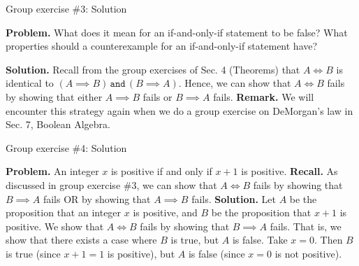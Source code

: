 \documentclass[10pt]{beamer}
\begin{document}
\begin{frame}{Group exercise \#3: Solution}

\textbf{Problem.} What does it mean for an if-and-only-if statement to be false? What properties should a counterexample for an if-and-only-if statement have?
\vfill 

\textbf{Solution.} Recall from the group exercises of Sec. 4 (Theorems) that $A \iff B$ is identical to $(A \implies B) \, \texttt{and} \, (B \implies A)$.  Hence, we can show that $A \iff B$ fails by showing that either $A \implies B$ fails or $B \implies A$ fails.
\vfill 
\pause 
\textbf{Remark.} We will encounter this strategy again when we do a group exercise on DeMorgan's law in Sec. 7, Boolean Algebra.
\end{frame}

\begin{frame}{Group exercise \#4: Solution}

\textbf{Problem.} An integer $x$ is positive if and only if $x+1$ is positive.
\pause 
\vfill 
\textbf{Recall.} As discussed in group exercise \#3, we can show that $A \iff B$ fails by showing that $B \implies A$ fails OR by showing that $A \implies B$ fails. 
\vfill 
\pause 
\textbf{Solution.}  Let $A$ be the proposition that an integer $x$ is positive, and $B$ be the proposition that $x+1$ is positive.  We show that $A \iff B$ fails by showing that $B \implies A$ fails.   That is, we show that there exists a case where $B$ is true, but $A$ is false.  Take $x=0$. Then $B$ is true (since $x+1=1$ is positive), but $A$ is false (since $x=0$ is not positive).   
\end{frame}
\end{document}
